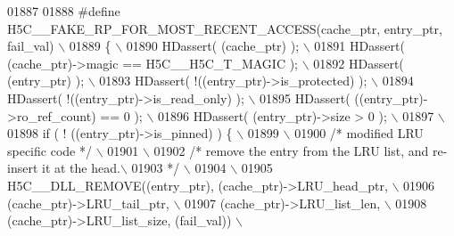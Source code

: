 \begin{DoxyCode}
01887 
01888 \textcolor{preprocessor}{#define H5C\_\_FAKE\_RP\_FOR\_MOST\_RECENT\_ACCESS(cache\_ptr, entry\_ptr, fail\_val) \(\backslash\)}
01889 \textcolor{preprocessor}{\{                                                                           \(\backslash\)}
01890 \textcolor{preprocessor}{    HDassert( (cache\_ptr) );                                                \(\backslash\)}
01891 \textcolor{preprocessor}{    HDassert( (cache\_ptr)->magic == H5C\_\_H5C\_T\_MAGIC );                     \(\backslash\)}
01892 \textcolor{preprocessor}{    HDassert( (entry\_ptr) );                                                \(\backslash\)}
01893 \textcolor{preprocessor}{    HDassert( !((entry\_ptr)->is\_protected) );                               \(\backslash\)}
01894 \textcolor{preprocessor}{    HDassert( !((entry\_ptr)->is\_read\_only) );                               \(\backslash\)}
01895 \textcolor{preprocessor}{    HDassert( ((entry\_ptr)->ro\_ref\_count) == 0 );                           \(\backslash\)}
01896 \textcolor{preprocessor}{    HDassert( (entry\_ptr)->size > 0 );                                      \(\backslash\)}
01897 \textcolor{preprocessor}{                                                                            \(\backslash\)}
01898 \textcolor{preprocessor}{    if ( ! ((entry\_ptr)->is\_pinned) ) \{                                     \(\backslash\)}
01899 \textcolor{preprocessor}{                                                                            \(\backslash\)}
01900 \textcolor{preprocessor}{        }\textcolor{comment}{/* modified LRU specific code */}\textcolor{preprocessor}{                                    \(\backslash\)}
01901 \textcolor{preprocessor}{                                                                            \(\backslash\)}
01902 \textcolor{preprocessor}{        }\textcolor{comment}{/* remove the entry from the LRU list, and re-insert it at the head.\(\backslash\)}
01903 \textcolor{comment}{     */}\textcolor{preprocessor}{                                                                 \(\backslash\)}
01904 \textcolor{preprocessor}{                                                                            \(\backslash\)}
01905 \textcolor{preprocessor}{        H5C\_\_DLL\_REMOVE((entry\_ptr), (cache\_ptr)->LRU\_head\_ptr,             \(\backslash\)}
01906 \textcolor{preprocessor}{                        (cache\_ptr)->LRU\_tail\_ptr,                          \(\backslash\)}
01907 \textcolor{preprocessor}{            (cache\_ptr)->LRU\_list\_len,                          \(\backslash\)}
01908 \textcolor{preprocessor}{                        (cache\_ptr)->LRU\_list\_size, (fail\_val))             \(\backslash\)}

\end{DoxyCode}

